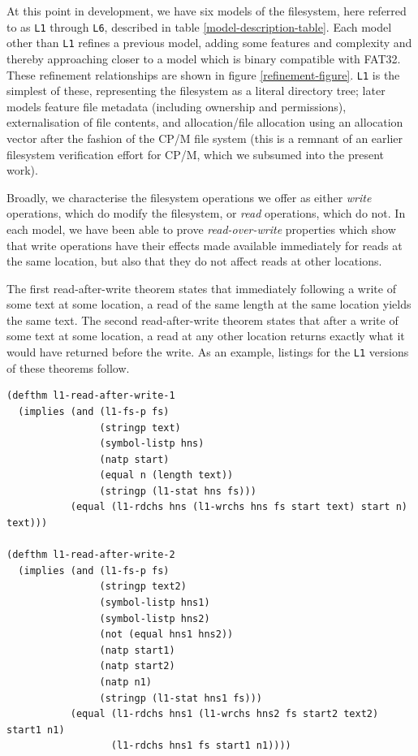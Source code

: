 \documentclass[runningheads,a4paper]{llncs}
\begin{document}
At this point in development, we have six models of the filesystem,
here referred to as \texttt{L1} through \texttt{L6}, described in
table \ref{model-description-table}. Each model other than \texttt{L1}
refines a previous model, adding some features and complexity and
thereby approaching closer to a model which is binary compatible with
FAT32. These refinement relationships are shown in figure
\ref{refinement-figure}. \texttt{L1} is the simplest of these,
representing the filesystem as a literal directory tree; later models
feature file metadata (including ownership and permissions),
externalisation of file contents, and allocation/file allocation using
an allocation vector after the fashion of the CP/M file system (this
is a remnant of an earlier filesystem verification effort for CP/M,
which we subsumed into the present work).

Broadly, we characterise the filesystem
operations we offer as either \textit{write} operations, which do
modify the filesystem, or \textit{read} operations, which do not. In
each model, we have been able to prove \textit{read-over-write}
properties which show that write operations have
their effects made available immediately for reads at the same
location, but also that they do not affect reads at other locations.

The first read-after-write theorem states that immediately following a
write of some text at some location, a read of the same length at the
same location yields the same text. The second read-after-write
theorem states that after a write of some text at some location, a
read at any other location returns exactly what it would have returned
before the write. As an example, listings for the \texttt{L1} versions
of these theorems follow.

\medskip

\noindent
\begin{verbatim}
(defthm l1-read-after-write-1
  (implies (and (l1-fs-p fs)
                (stringp text)
                (symbol-listp hns)
                (natp start)
                (equal n (length text))
                (stringp (l1-stat hns fs)))
           (equal (l1-rdchs hns (l1-wrchs hns fs start text) start n) text)))

(defthm l1-read-after-write-2
  (implies (and (l1-fs-p fs)
                (stringp text2)
                (symbol-listp hns1)
                (symbol-listp hns2)
                (not (equal hns1 hns2))
                (natp start1)
                (natp start2)
                (natp n1)
                (stringp (l1-stat hns1 fs)))
           (equal (l1-rdchs hns1 (l1-wrchs hns2 fs start2 text2) start1 n1)
                  (l1-rdchs hns1 fs start1 n1))))
\end{verbatim}
\end{document}
